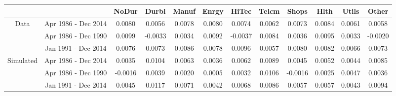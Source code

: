 \begin{tabular}{cccccccccccc}
	\hline
	& & NoDur & Durbl & Manuf & Enrgy & HiTec & Telcm & Shops & Hlth & Utils & Other \\ 
	\hline
	\multirow{3}{*}{Data} & Apr 1986 - Dec 2014 & 0.0080 & 0.0056 & 0.0078 & 0.0080 & 0.0074 & 0.0062 & 0.0073 & 0.0084 & 0.0061 & 0.0058 \\ 
	& Apr 1986 - Dec 1990 & 0.0099 & -0.0033 & 0.0034 & 0.0092 & -0.0037 & 0.0084 & 0.0036 & 0.0095 & 0.0033 & -0.0020 \\ 
	& Jan 1991 - Dec 2014 & 0.0076 & 0.0073 & 0.0086 & 0.0078 & 0.0096 & 0.0057 & 0.0080 & 0.0082 & 0.0066 & 0.0073 \\ 
	\hline
	\multirow{3}{*}{Simulated} & Apr 1986 - Dec 2014 & 0.0035 & 0.0104 & 0.0063 & 0.0036 & 0.0062 & 0.0089 & 0.0045 & 0.0052 & 0.0044 & 0.0085 \\ 
	& Apr 1986 - Dec 1990 & -0.0016 & 0.0039 & 0.0020 & 0.0005 & 0.0032 & 0.0106 & -0.0016 & 0.0025 & 0.0047 & 0.0036 \\ 
	& Jan 1991 - Dec 2014 & 0.0045 & 0.0117 & 0.0071 & 0.0042 & 0.0068 & 0.0086 & 0.0057 & 0.0057 & 0.0043 & 0.0094 \\ 
	\hline
\end{tabular}